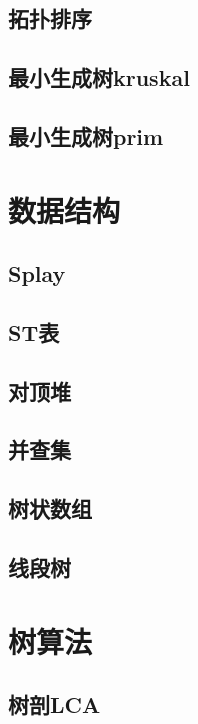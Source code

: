 \documentclass{article}
\begin{document}
\begin{multicols*}{2}
\subsection{拓扑排序}

\subsection{最小生成树kruskal}

\subsection{最小生成树prim}

\section{数据结构}
\subsection{Splay}

\subsection{ST表}

\subsection{对顶堆}

\subsection{并查集}

\subsection{树状数组}

\subsection{线段树}

\section{树算法}
\subsection{树剖LCA}


\end{multicols*}
\end{document}
